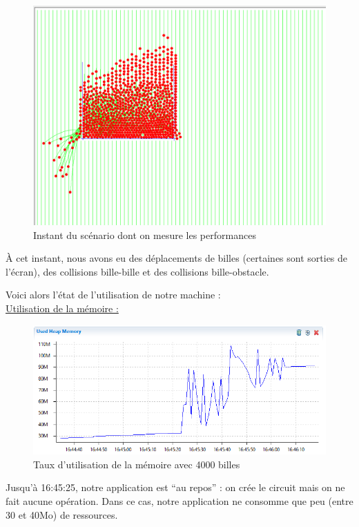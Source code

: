 \documentclass{report}
\begin{document}
\begin{figure}[H]
\centering
\includegraphics[scale=0.6]{one_time_tests.png}
\caption{Instant du scénario dont on mesure les performances}
\end{figure}

À cet instant, nous avons eu des déplacements de billes (certaines sont sorties de l’écran), des collisions bille-bille et des collisions bille-obstacle.

\newpage
Voici alors l’état de l’utilisation de notre machine : \\


\underline{Utilisation de la mémoire :}

\begin{figure}[H]
\centering
\includegraphics[scale=0.9]{timeline_memory.png}
\caption{Taux d'utilisation de la mémoire avec 4000 billes}
\end{figure}

Jusqu’à 16:45:25, notre application est “au repos” : on crée le circuit mais on ne fait aucune opération. Dans ce cas, notre application ne consomme que peu (entre 30 et 40Mo) de ressources. 
\end{document}

